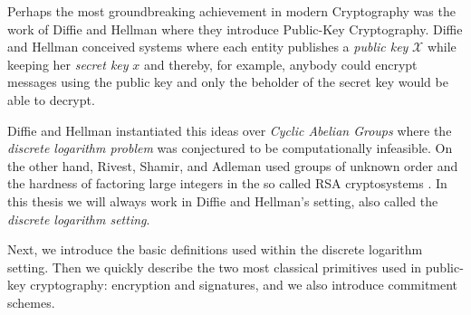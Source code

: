 Perhaps the most groundbreaking achievement in modern Cryptography was the work of Diffie and Hellman \cite{DifHel76} where they introduce Public-Key Cryptography. Diffie and Hellman conceived systems where each entity publishes a \emph{public key} $\mathcal{X}$ while keeping her \emph{secret key} $x$ and thereby, for example, anybody could encrypt messages using the public key and only the beholder of the secret key would be able to decrypt.

Diffie and Hellman instantiated this ideas over \emph{Cyclic Abelian Groups} where the \emph{discrete logarithm problem} was conjectured to be computationally infeasible. On the other hand, Rivest, Shamir, and Adleman used groups of unknown order and the hardness of factoring large integers in the so called RSA cryptosystems \cite{RivShaAdl78}.
In this thesis we will always work in Diffie and Hellman's setting, also called the \emph{discrete logarithm setting}.

Next, we introduce the basic definitions used within the discrete logarithm setting. Then we quickly describe the two most classical primitives used in public-key cryptography: encryption and signatures, and we also introduce commitment schemes.


